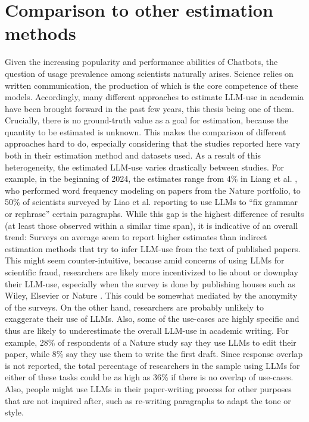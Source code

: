 \section{Comparison to other estimation methods}
Given the increasing popularity and performance abilities of Chatbots, the question of usage prevalence among scientists naturally arises.
Science relies on written communication, the production of which is the core competence of these models.
Accordingly, many different approaches to estimate LLM-use in academia have been brought forward in the past few years, this thesis being one of them.
Crucially, there is no ground-truth value as a goal for estimation, because the quantity to be estimated is unknown.
This makes the comparison of different approaches hard to do, especially considering that the studies reported here vary both in their estimation method and datasets used.
As a result of this heterogeneity, the estimated LLM-use varies drastically between studies. 
For example, in the beginning of 2024, the estimates range from 4\% in Liang et al. \cite{Liang2024_paper}, who performed word frequency modeling on papers from the Nature portfolio, to 50\% of scientists surveyed by Liao et al. \cite{Liao2024} reporting to use LLMs to ``fix grammar or rephrase'' certain paragraphs.
While this gap is the highest difference of results (at least those observed within a similar time span), it is indicative of an overall trend: Surveys on average seem to report higher estimates than indirect estimation methods that try to infer LLM-use from the text of published papers.
This might seem counter-intuitive, because amid concerns of using LLMs for scientific fraud, researchers are likely more incentivized to lie about or downplay their LLM-use, especially when the survey is done by publishing houses such as Wiley, Elsevier or Nature \cite{Elsevier2024,Kwon2025,VanNoorden2023,Nordling2023,Wiley2026,Wiley2025}.
This could be somewhat mediated by the anonymity of the surveys.
On the other hand, researchers are probably unlikely to exaggerate their use of LLMs.
Also, some of the use-cases are highly specific and thus are likely to underestimate the overall LLM-use in academic writing.
For example, 28\% of respondents of a Nature study \cite{Kwon2025} say they use LLMs to edit their paper, while 8\% say they use them to write the first draft.
Since response overlap is not reported, the total percentage of researchers in the sample using LLMs for either of these tasks could be as high as 36\% if there is no overlap of use-cases. 
Also, people might use LLMs in their paper-writing process for other purposes that are not inquired after, such as re-writing paragraphs to adapt the tone or style.
